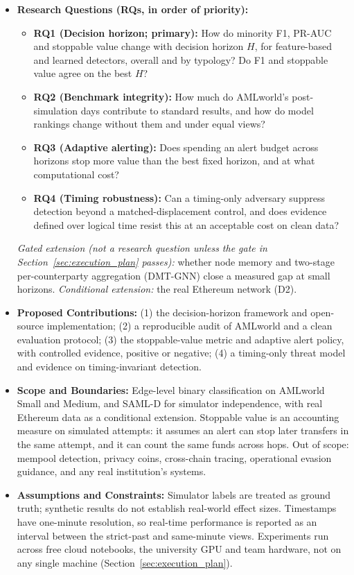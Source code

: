 \documentclass[11pt,a4paper]{article}
\begin{document}
\begin{itemize}[leftmargin=*]
    \item \textbf{Research Questions (RQs, in order of priority):}
    \begin{itemize}[leftmargin=*]
        \item \textbf{RQ1 (Decision horizon; primary):} How do minority F1, PR-AUC and stoppable value change with decision horizon $H$, for feature-based and learned detectors, overall and by typology? Do F1 and stoppable value agree on the best $H$?
        \item \textbf{RQ2 (Benchmark integrity):} How much do AMLworld's post-simulation days contribute to standard results, and how do model rankings change without them and under equal views?
        \item \textbf{RQ3 (Adaptive alerting):} Does spending an alert budget across horizons stop more value than the best fixed horizon, and at what computational cost?
        \item \textbf{RQ4 (Timing robustness):} Can a timing-only adversary suppress detection beyond a matched-displacement control, and does evidence defined over logical time resist this at an acceptable cost on clean data?
    \end{itemize}
    \textit{Gated extension (not a research question unless the gate in Section~\ref{sec:execution_plan} passes):} whether node memory and two-stage per-counterparty aggregation (DMT-GNN) close a measured gap at small horizons. \textit{Conditional extension:} the real Ethereum network (D2).

    \item \textbf{Proposed Contributions:}
    (1) the decision-horizon framework and open-source implementation; (2) a reproducible audit of AMLworld and a clean evaluation protocol; (3) the stoppable-value metric and adaptive alert policy, with controlled evidence, positive or negative; (4) a timing-only threat model and evidence on timing-invariant detection.

    \item \textbf{Scope and Boundaries:}
    Edge-level binary classification on AMLworld Small and Medium, and SAML-D for simulator independence, with real Ethereum data as a conditional extension. Stoppable value is an accounting measure on simulated attempts: it assumes an alert can stop later transfers in the same attempt, and it can count the same funds across hops. Out of scope: mempool detection, privacy coins, cross-chain tracing, operational evasion guidance, and any real institution's systems.

    \item \textbf{Assumptions and Constraints:}
    Simulator labels are treated as ground truth; synthetic results do not establish real-world effect sizes. Timestamps have one-minute resolution, so real-time performance is reported as an interval between the strict-past and same-minute views. Experiments run across free cloud notebooks, the university GPU and team hardware, not on any single machine (Section~\ref{sec:execution_plan}).
\end{itemize}
\end{document}
